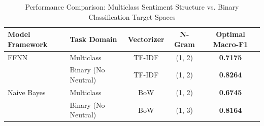 \begin{table}[htbp]
    \centering
    \caption{Performance Comparison: Multiclass Sentiment Structure vs. Binary Classification Target Spaces}
    \label{tab:multiclass_binary_comparison}
    \small
    \begin{tabular}{llccc}
    \toprule
    \textbf{Model Framework} & \textbf{Task Domain} & \textbf{Vectorizer} & \textbf{N-Gram} & \textbf{Optimal Macro-F1} \\
    \midrule
    FFNN & Multiclass & TF-IDF & (1, 2) & \textbf{0.7175} \\
     & Binary (No Neutral) & TF-IDF & (1, 2) & \textbf{0.8264} \\
    \midrule
    Naive Bayes & Multiclass & BoW & (1, 2) & \textbf{0.6745} \\
     & Binary (No Neutral) & BoW & (1, 3) & \textbf{0.8164} \\
    \bottomrule
    \end{tabular}
\end{table}
